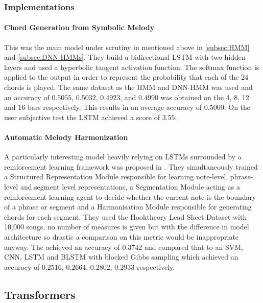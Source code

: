 \subsubsection{Implementations}

\paragraph{Chord Generation from Symbolic Melody} This was the main model under scrutiny in \cite{BLSTM} mentioned above in \autoref{subsec:HMM} and \autoref{subsec:DNN-HMMs}.
They build a bidirectional LSTM with two hidden layers and used a hyperbolic tangent activation function. The softmax function is applied to the output in order to represent the probability that each of the 24 chords is played.
The same dataset as the HMM and DNN-HMM was used and an accuracy of $0.5055$, $0.5032$, $0.4923$, and $0.4990$  was obtained on the 4, 8, 12 and 16 bars respectively. This results in an average accuracy of $0.5000$.
On the user subjective test the LSTM achieved a score of $3.55$.

\paragraph{Automatic Melody Harmonization} A particularly interesting model heavily relying on LSTMs surrounded by a reinforcement learning framework was proposed in \cite{ReinforcementLearning}.
They simultaneously trained a Structured Representation Module responsible for learning note-level, phrase-level and segment level representations, a Segmentation Module acting as a reinforcement learning agent to decide whether the current note is the boundary of a phrase or segment and a Harmonisation Module responsible for generating chords for each segment.
They used the Hooktheory Lead Sheet Dataset with 10,000 songs, no number of measures is given but with the difference in model architecture so drastic a comparison on this metric would be inappropriate anyway.
The achieved an accuracy of $0.3742$ and compared that to an SVM, CNN, LSTM and BLSTM with blocked Gibbs sampling which achieved an accuracy of $0.2516$, $0.2664$, $0.2802$, $0.2933$ respectively.

\subsection{Transformers}

